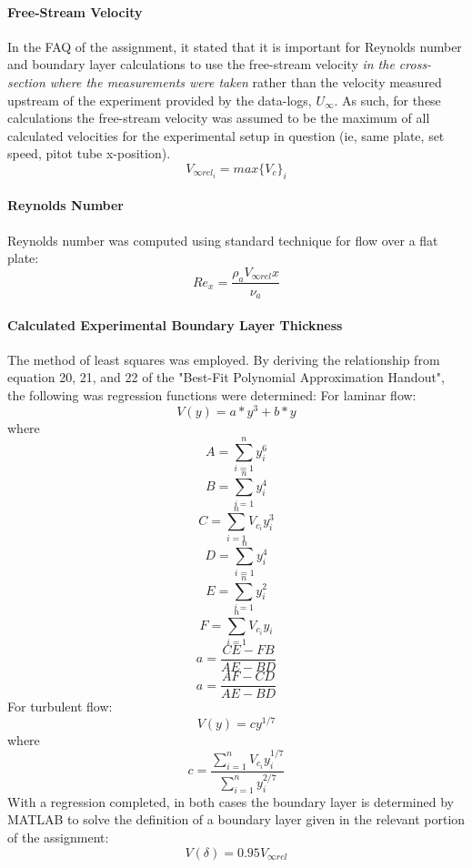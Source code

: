 \documentclass[12pt]{article}
\begin{document}
	\paragraph{Free-Stream Velocity} In the FAQ of the assignment, it stated that it is important for Reynolds number and boundary layer calculations to use the free-stream velocity \textit{in the cross-section where the measurements were taken} rather than the velocity measured upstream of the experiment provided by the data-logs, $U_\infty$.\hfill\break
	As such, for these calculations the free-stream velocity was assumed to be the maximum of all calculated velocities for the experimental setup in question (ie, same plate, set speed, pitot tube x-position).
	\begin{equation}
		V_{\infty rel_i} = max\{V_c\}_i
	\end{equation}
	\paragraph{Reynolds Number} Reynolds number was computed using standard technique for flow over a flat plate:
	\begin{equation}
		Re_x = \frac{\rho_a V_{\infty rel} x}{\nu_a}
	\end{equation}
	
	\paragraph{Calculated Experimental Boundary Layer Thickness} The method of least squares was employed. By deriving the relationship from equation 20, 21, and 22 of the "Best-Fit Polynomial Approximation Handout", the following was regression functions were determined:
	\hfill\break
	For laminar flow:
	\begin{equation}
		V(y) = a*y^3 + b*y
	\end{equation}
	where
	$$ A = \sum_{i=1}^{n}{y_i^6}$$
	$$ B = \sum_{i=1}^{n}{y_i^4}$$
	$$ C = \sum_{i=1}^{n}{V_{c_i} y_i^3}$$
	$$ D = \sum_{i=1}^{n}{y_i^4}$$
	$$ E = \sum_{i=1}^{n}{y_i^2}$$
	$$ F = \sum_{i=1}^{n}{V_{c_i} y_i}$$
	\begin{equation}
		a = \frac{CE- FB}{AE - BD}
	\end{equation}
	\begin{equation}
	a = \frac{AF - CD}{AE - BD}
	\end{equation}
	\hfill\break\break
	For turbulent flow:
	\begin{equation}
	V(y) = cy^{1/7}
	\end{equation}
	where
	\begin{equation}
	c = \frac{\sum_{i=1}^{n}{V_{c_i} y_i^{1/7}}}{\sum_{i=1}^{n}{y_i^{2/7}}}
	\end{equation}
	\hfill\break\break
	With a regression completed, in both cases the boundary layer is determined by MATLAB to solve the definition of a boundary layer given in the relevant portion of the assignment:
	\begin{equation}
		V(\delta) = 0.95V_{\infty rel}
	\end{equation}
	
\end{document}
